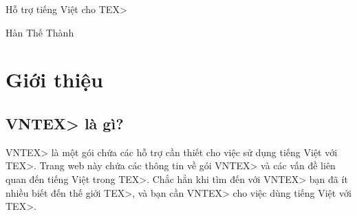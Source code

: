 \documentclass[12pt,a4paper]{article}
\newcommand{\htmlheader}
{Hỗ trợ tiếng Việt cho \<TEX>}
\begin{document}








{\huge\centering\htmlheader\par}
\begin{center}
  Hàn Thế Thành
\end{center}

\section{Giới thiệu}

\subsection{\<VNTEX> là gì?}
\<VNTEX> là một gói chứa các hỗ trợ cần thiết cho việc sử dụng tiếng Việt
với \<TEX>. Trang web này chứa các thông tin về gói \<VNTEX> và các vấn đề
liên quan đến tiếng Việt trong \<TEX>. Chắc hẳn khi tìm đến với \<VNTEX>
bạn đã ít nhiều biết đến thế giới \<TEX>, và bạn cần \<VNTEX> cho việc dùng
tiếng Việt với \<TEX>.
\end{document}
